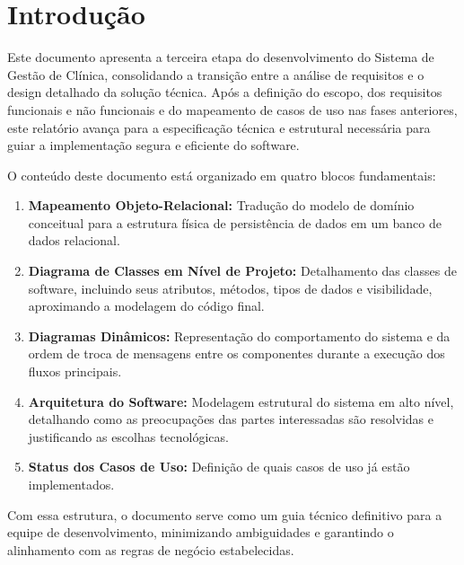 \chapter{Introdução}

Este documento apresenta a terceira etapa do desenvolvimento do Sistema de Gestão de Clínica, consolidando a transição entre a análise de requisitos e o design detalhado da solução técnica. Após a definição do escopo, dos requisitos funcionais e não funcionais e do mapeamento de casos de uso nas fases anteriores, este relatório avança para a especificação técnica e estrutural necessária para guiar a implementação segura e eficiente do software.

O conteúdo deste documento está organizado em quatro blocos fundamentais:
\begin{enumerate}
    \item \textbf{Mapeamento Objeto-Relacional:} Tradução do modelo de domínio conceitual para a estrutura física de persistência de dados em um banco de dados relacional.
    \item \textbf{Diagrama de Classes em Nível de Projeto:} Detalhamento das classes de software, incluindo seus atributos, métodos, tipos de dados e visibilidade, aproximando a modelagem do código final.
    \item \textbf{Diagramas Dinâmicos:} Representação do comportamento do sistema e da ordem de troca de mensagens entre os componentes durante a execução dos fluxos principais.
    \item \textbf{Arquitetura do Software:} Modelagem estrutural do sistema em alto nível, detalhando como as preocupações das partes interessadas são resolvidas e justificando as escolhas tecnológicas.
    \item  \textbf{Status dos Casos de Uso:} Definição de quais casos de uso já estão implementados.
\end{enumerate}

Com essa estrutura, o documento serve como um guia técnico definitivo para a equipe de desenvolvimento, minimizando ambiguidades e garantindo o alinhamento com as regras de negócio estabelecidas.